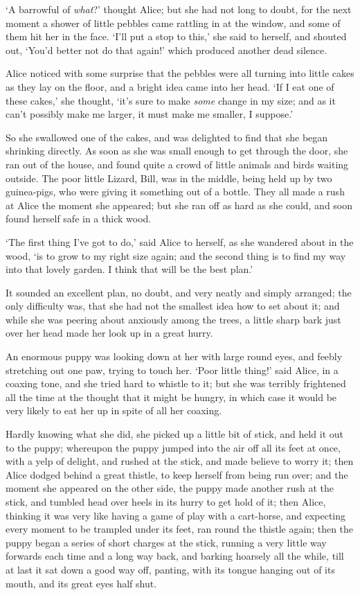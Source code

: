 \documentclass[12pt,openany]{memoir}
\begin{document}
`A barrowful of \textit{what}?' thought Alice; but she had not long to doubt, for the next moment a shower of little pebbles came rattling in at the window, and some of them hit her in the face. `I'll put a stop to this,' she said to herself, and shouted out, `You'd better not do that again!' which produced another dead silence.

Alice noticed with some surprise that the pebbles were all turning into little cakes as they lay on the floor, and a bright idea came into her head. `If I eat one of these cakes,' she thought, `it's sure to make \textit{some} change in my size; and as it can't possibly make me larger, it must make me smaller, I suppose.'

So she swallowed one of the cakes, and was delighted to find that she began shrinking directly. As soon as she was small enough to get through the door, she ran out of the house, and found quite a crowd of little animals and birds waiting outside. The poor little Lizard, Bill, was in the middle, being held up by two guinea-pigs, who were giving it something out of a bottle. They all made a rush at Alice the moment she appeared; but she ran off as hard as she could, and soon found herself safe in a thick wood.

`The first thing I've got to do,' said Alice to herself, as she wandered about in the wood, `is to grow to my right size again; and the second thing is to find my way into that lovely garden. I think that will be the best plan.'

It sounded an excellent plan, no doubt, and very neatly and simply arranged; the only difficulty was, that she had not the smallest idea how to set about it; and while she was peering about anxiously among the trees, a little sharp bark just over her head made her look up in a great hurry.

An enormous puppy was looking down at her with large round eyes, and feebly stretching out one paw, trying to touch her. `Poor little thing!' said Alice, in a coaxing tone, and she tried hard to whistle to it; but she was terribly frightened all the time at the thought that it might be hungry, in which case it would be very likely to eat her up in spite of all her coaxing.

Hardly knowing what she did, she picked up a little bit of stick, and held it out to the puppy; whereupon the puppy jumped into the air off all its feet at once, with a yelp of delight, and rushed at the stick, and made believe to worry it; then Alice dodged behind a great thistle, to keep herself from being run over; and the moment she appeared on the other side, the puppy made another rush at the stick, and tumbled head over heels in its hurry to get hold of it; then Alice, thinking it was very like having a game of play with a cart-horse, and expecting every moment to be trampled under its feet, ran round the thistle again; then the puppy began a series of short charges at the stick, running a very little way forwards each time and a long way back, and barking hoarsely all the while, till at last it sat down a good way off, panting, with its tongue hanging out of its mouth, and its great eyes half shut.
\end{document}
